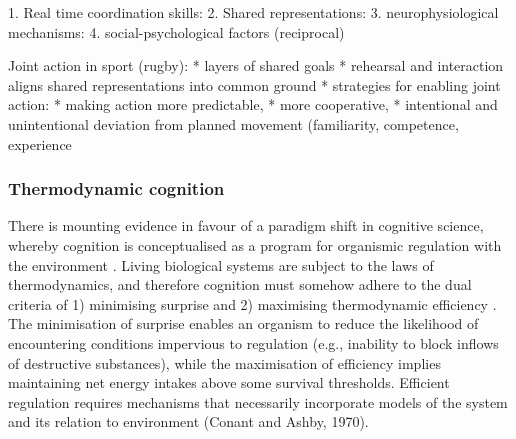 \begin{CJK}{UTF8}{gbsn}
1. Real time coordination skills:
2. Shared representations:
3. neurophysiological mechanisms:
4. social-psychological factors (reciprocal)

Joint action in sport (rugby):
* layers of shared goals
* rehearsal and interaction aligns shared representations into common ground
* strategies for enabling joint action:
    * making action more predictable,
    * more cooperative,
* intentional and unintentional deviation from planned movement (familiarity, competence, experience











\subsubsection{Thermodynamic cognition}

There is mounting evidence in favour of a paradigm shift in cognitive science, whereby cognition is conceptualised as a program for organismic regulation with the environment \citep{Yufik2017}.  Living biological systems are subject to the laws of thermodynamics, and therefore cognition must somehow adhere to the dual criteria of 1) minimising surprise \citep{Friston2010,Sengupta2013,Sengupta2016,SenguptaFriston2017} and 2) maximising thermodynamic efficiency \citep{Yufik2002,Yufik2013}.  The minimisation of surprise enables an organism to reduce the likelihood of encountering conditions impervious to regulation (e.g., inability to block inflows of destructive substances), while the maximisation of efficiency implies maintaining net energy intakes above some survival thresholds.  Efficient regulation requires mechanisms that necessarily incorporate models of the system and its relation to environment (Conant and Ashby, 1970).


\end{CJK}
